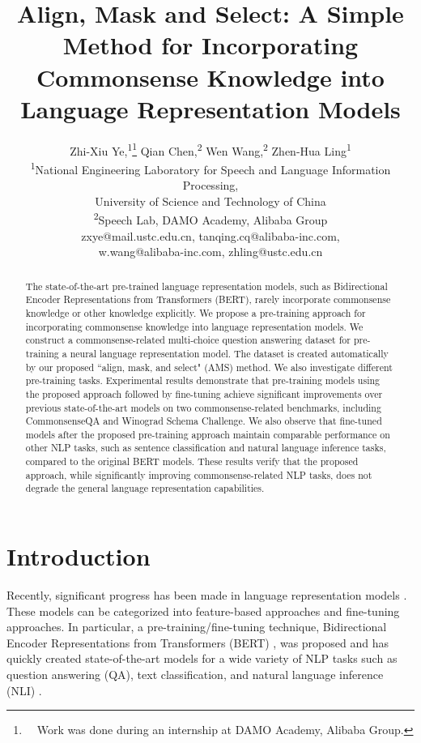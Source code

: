 \documentclass[11pt,a4paper]{article}
\title{Align, Mask and Select: A Simple Method for Incorporating \\ Commonsense Knowledge into Language Representation Models}
\author{Zhi-Xiu Ye,\textsuperscript{\rm 1}\thanks{~~Work was done during an internship at DAMO Academy, Alibaba Group.} Qian Chen,\textsuperscript{\rm 2} Wen Wang,\textsuperscript{\rm 2}  Zhen-Hua Ling\textsuperscript{\rm 1} \\
\textsuperscript{\rm 1}National Engineering Laboratory for Speech and Language Information Processing, \\
University of Science and Technology of China \\
\textsuperscript{\rm 2}Speech Lab, DAMO Academy, Alibaba Group \\
zxye@mail.ustc.edu.cn, tanqing.cq@alibaba-inc.com, \\
w.wang@alibaba-inc.com, zhling@ustc.edu.cn
}
\date{}
\begin{document}
\maketitle
\begin{abstract}
The state-of-the-art pre-trained language representation models, such as Bidirectional Encoder Representations from Transformers (BERT), rarely incorporate commonsense knowledge or other knowledge explicitly. We propose a pre-training approach for incorporating commonsense knowledge into language representation models. We construct a commonsense-related multi-choice question answering dataset for pre-training a neural language representation model. The dataset is created automatically by our proposed ``align, mask, and select" (AMS) method. We also investigate different pre-training tasks.
Experimental results demonstrate that pre-training models using the proposed approach followed by fine-tuning achieve significant improvements over previous state-of-the-art models on two commonsense-related benchmarks, including CommonsenseQA and Winograd Schema Challenge. We also observe that fine-tuned models after the proposed pre-training approach maintain comparable performance on other NLP tasks, such as sentence classification and natural language inference tasks, compared to the original BERT models. These results verify that the proposed approach, while significantly improving commonsense-related NLP tasks, does not degrade the general language representation capabilities.



\end{abstract}

\section{Introduction}

Recently, significant progress has been made in language representation models \cite{pennington-etal-2014-glove,peters-etal-2017-semi,howard-ruder-2018-universal,radford2018improving,devlin-etal-2019-bert,zhang2019ernie}. These models can be categorized into feature-based approaches and fine-tuning approaches. In particular, a pre-training/fine-tuning technique, Bidirectional Encoder Representations from Transformers (BERT) \cite{devlin-etal-2019-bert}, was proposed and has quickly created state-of-the-art models for a wide variety of NLP tasks such as question answering (QA), text classification, and natural language inference (NLI) \cite{rajpurkar-etal-2016-squad,wang-etal-2018-glue}.
\end{document}
